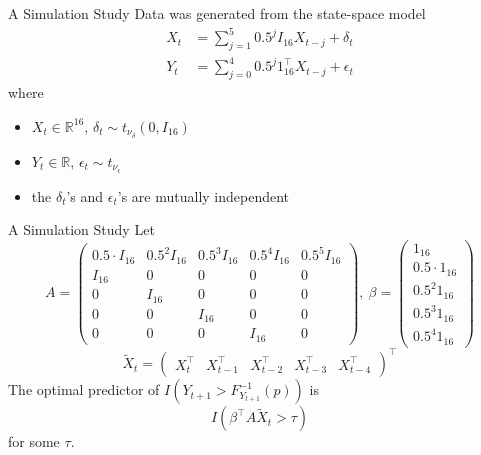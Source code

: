 \documentclass{beamer}
\def\R{\mathbb R}
\begin{document}
\begin{frame}{A Simulation Study}
    Data was generated from the state-space model
    \begin{align*}
        X_t &= \sum_{j = 1}^5 0.5^j I_{16}X_{t - j} + \delta_t \\
        Y_t &= \sum_{j = 0}^4 0.5^j 1_{16}^{\top}X_{t - j} + \epsilon_t
    \end{align*}
    where
    \begin{itemize}
        \item $X_t \in \R^{16}$, $\delta_t \sim t_{\nu_{\delta}}(0, I_{16})$
        \item $Y_t \in \R$, $\epsilon_t \sim t_{\nu_{\epsilon}}$
        \item the $\delta_t$'s and $\epsilon_t$'s are mutually independent
    \end{itemize}
\end{frame}

\begin{frame}{A Simulation Study}
    Let 
    \[
    A =
    \left(
    \begin{matrix}
        0.5 \cdot I_{16} & 0.5^2 I_{16} & 0.5^3 I_{16} & 0.5^4 I_{16} & 0.5^5 I_{16} \\
        I_{16} & 0 & 0 & 0 & 0 \\
        0 & I_{16} & 0 & 0 & 0 \\
        0 & 0 & I_{16} & 0 & 0 \\
        0 & 0 & 0 & I_{16} & 0
    \end{matrix}
    \right), \
    \beta =
    \left(
    \begin{matrix}
        1_{16} \\
        0.5 \cdot 1_{16} \\
        0.5^2 1_{16} \\
        0.5^3 1_{16} \\
        0.5^4 1_{16}
    \end{matrix}
    \right)
    \]
    \[
    \tilde{X}_t = 
    \left(
    \begin{matrix}
        X_t^{\top} & X_{t - 1}^{\top} & X_{t - 2}^{\top} & X_{t - 3}^{\top} & X_{t - 4}^{\top}
    \end{matrix}
    \right)^{\top}
    \]
    The optimal predictor of $I(Y_{t + 1} > F_{Y_{t + 1}}^{-1}(p))$ is
    \[
    I(\beta^{\top} A\tilde{X}_t > \tau)
    \]
    for some $\tau$.
\end{frame}
\end{document}
